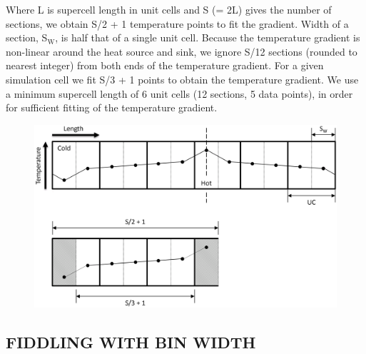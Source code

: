 Where L is supercell length in unit cells and S (= 2L) gives the number of sections, we obtain S/2 + 1 temperature points to fit the gradient. Width of a section, S$_{\mathrm{W}}$, is half that of a single unit cell. Because the temperature gradient is non-linear around the heat source and sink, we ignore S/12 sections (rounded to nearest integer) from both ends of the temperature gradient. For a given simulation cell we fit S/3 + 1 points to obtain the temperature gradient. We use a minimum supercell length of 6 unit cells (12 sections, 5 data points), in order for sufficient fitting of the temperature gradient. 



\begin{figure}[h!]
\includegraphics[width=\linewidth]{Figures/direct_temp_pro_03.png}
\caption[direct temperature profile 3]{}
\label{fig:direct_temp_pro_03}
\end{figure}

\subsection{\label{sec:3.DM.bin}FIDDLING WITH BIN WIDTH}


